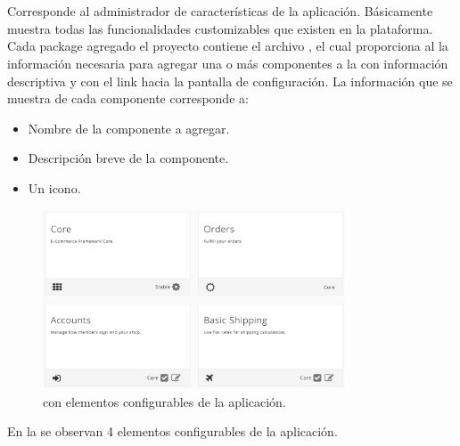 \section{\dashboardEF}
	Corresponde al administrador de características de la aplicación. Básicamente muestra todas las funcionalidades customizables que existen en la plataforma.
	Cada package agregado el proyecto contiene el archivo \packageDescriptionFILE, el cual proporciona al \dashboardEF la información necesaria para agregar una o más componentes a la \uiSiglaAS con información descriptiva y con el link hacia la pantalla de configuración.
	La información que se muestra de cada componente corresponde a:

	\begin{itemize}
		\item Nombre de la componente a agregar.
		\item Descripción breve de la componente.
		\item Un icono.
	\end{itemize} 


	\begin{figure}[!h]
		\centering
		\includegraphics[width=0.8\textwidth]{figuras/dashboard/dashboard_menu.png}
		\caption{\dashboardEF con elementos configurables de la aplicación.}
		\label{figure:dashboard:dashboard_menu}
	\end{figure}

	En la  se observan 4 elementos configurables de la aplicación. 

	

	

	

	

	
